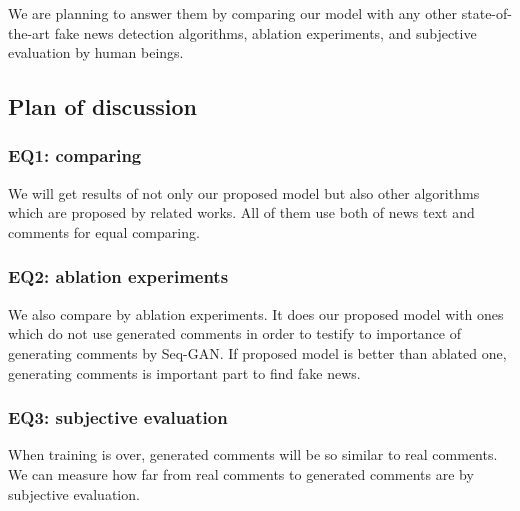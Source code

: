We are planning to answer them by comparing our model with any other state-of-the-art fake news detection algorithms,
ablation experiments, and subjective evaluation by human beings.

\subsection{Plan of discussion}
\subsubsection{EQ1: comparing}
We will get results of not only our proposed model but also other algorithms which are proposed by related works.
All of them use both of news text and comments for equal comparing.
\subsubsection{EQ2: ablation experiments}
We also compare by ablation experiments.
It does our proposed model with ones which do not use generated comments in order to
testify to importance of generating comments by Seq-GAN.
If proposed model is better than ablated one, generating comments is important part to find fake news.
\subsubsection{EQ3: subjective evaluation}
When training is over, generated comments will be so similar to real comments.
We can measure how far from real comments to generated comments are by subjective evaluation.